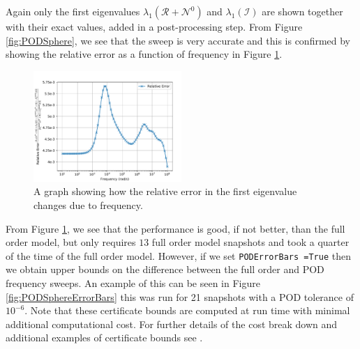 \noindent
Again only the first eigenvalues $\lambda_1({\mathcal R}+{\mathcal N}^0)$ and $\lambda_1({\mathcal I})$ are shown  together with their exact values, added in a post-processing step. From Figure \ref{fig:PODSphere}, we see that the sweep is very accurate and this is confirmed by showing the relative error as a function of frequency  in Figure \ref{fig:PODSphereError}.
\begin{figure}[H]
\begin{center}
\includegraphics[width=0.5\textwidth]{Figures/PODError/PODError.pdf}
\caption{A graph showing how the relative error in the first eigenvalue changes due to frequency.}\label{fig:PODSphereError}
\end{center}
\end{figure}
\noindent
From Figure \ref{fig:PODSphereError}, we see that the performance is good, if not better, than the full order model, but only requires $13$ full order model snapshots
and took a quarter of the time of the full order model. However, if we set \texttt{PODErrorBars =True} then we obtain upper bounds on the difference between the full order and POD frequency sweeps. An example of this can be seen in Figure \ref{fig:PODSphereErrorBars} this was run for 21 snapshots with a POD tolerance of $10^{-6}$. Note that these certificate bounds are computed at run time with minimal additional computational cost. For further details of the cost break down and additional examples of certificate bounds see \cite{wilsonledger2019}.

